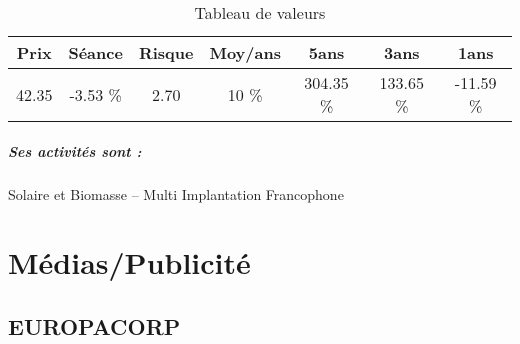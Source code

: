 \documentclass[11pt,a4paper]{report}%
\begin{document}
\begin{table}[H]
  \centering
    \begin{tabular}{|c|c|c|c|c|c|c|}
    \hline
    Prix & Séance & Risque  & Moy/ans & 5ans & 3ans & 1ans \\
    \hline
    42.35 &    -3.53 \%    & 2.70 & 10 \% & 304.35 \% & 133.65 \% & -11.59 \% \\
    \hline
    \end{tabular}%
        \label{tab:table_ALBIOMA}%
      \caption{Tableau de valeurs}
\end{table}%

\paragraph{Ses activités sont : } Solaire et Biomasse – Multi Implantation Francophone 
    
    \newpage\chapter{Médias/Publicité}


\section{EUROPACORP}
\end{document}
